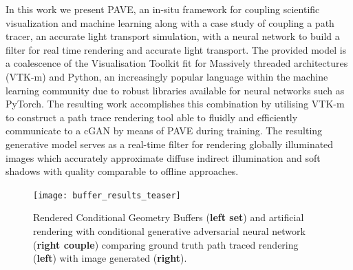 In this work we present PAVE, an in-situ framework for coupling scientific visualization and machine learning along with a case study of coupling a path tracer, an accurate light transport simulation, with a neural network to build a filter for real time rendering and accurate light transport. The provided model is a coalescence of the Visualisation Toolkit fit for Massively threaded architectures (VTK-m) and Python, an increasingly popular language within the machine learning community due to robust libraries available for neural networks such as PyTorch. The resulting work accomplishes this combination by utilising VTK-m to construct a path trace rendering tool able to fluidly and efficiently communicate to a cGAN by means of PAVE during training.   The resulting generative model serves as a real-time filter for rendering globally illuminated images which accurately approximate diffuse indirect illumination and soft shadows with quality comparable to offline approaches. 

\begin{figure}
    \texttt{[image: buffer\_results\_teaser]}
    \caption{Rendered Conditional Geometry Buffers ({\bf left set}) and artificial rendering with conditional generative adversarial neural network ({\bf right couple}) comparing ground truth path traced rendering ({\bf left}) with image generated ({\bf right}).}
  \end{figure}
